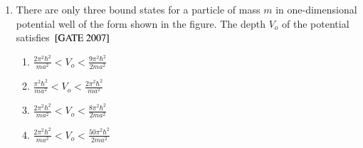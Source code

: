 \documentclass[journal]{IEEEtran}
\begin{document}
\begin{enumerate}
\begin{multicols}{4}
\begin{enumerate}
\end{enumerate}
\end{multicols}
\item There are only three bound states for a particle of mass $m$ in one-dimensional potential well of the form shown in the figure. The depth $V_o$ of the potential satisfies 
\hfill{${}\left[\text{GATE 2007}\right]$} 



\begin{center}
\end{center}



\begin{multicols}{2}
\begin{enumerate}
    \item $\frac{2\pi^2\hbar^2}{ma^2}<V_o< \frac{9\pi^2\hbar^2}{2ma^2} $
     \item $\frac{\pi^2\hbar^2}{ma^2}<V_o< \frac{2\pi^2\hbar^2}{ma^2} $
      \item $\frac{2\pi^2\hbar^2}{ma^2}<V_o< \frac{8\pi^2\hbar^2}{2ma^2} $
       \item $\frac{2\pi^2\hbar^2}{ma^2}<V_o< \frac{50\pi^2\hbar^2}{2ma^2} $ 
       

\end{enumerate}
\end{multicols}
\end{enumerate}
\end{document}
